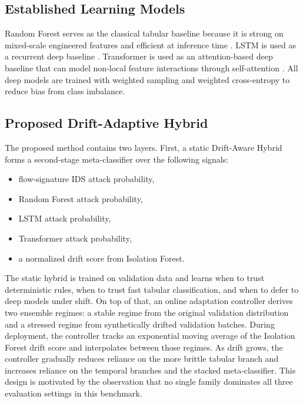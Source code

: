\documentclass[conference]{IEEEtran}
\begin{document}
\subsection{Established Learning Models}
Random Forest serves as the classical tabular baseline because it is strong on mixed-scale engineered features and efficient at inference time \cite{breiman2001random}. LSTM is used as a recurrent deep baseline \cite{hochreiter1997lstm}. Transformer is used as an attention-based deep baseline that can model non-local feature interactions through self-attention \cite{vaswani2017attention}. All deep models are trained with weighted sampling and weighted cross-entropy to reduce bias from class imbalance.

\subsection{Proposed Drift-Adaptive Hybrid}
The proposed method contains two layers. First, a static Drift-Aware Hybrid forms a second-stage meta-classifier over the following signals:
\begin{itemize}
\item flow-signature IDS attack probability,
\item Random Forest attack probability,
\item LSTM attack probability,
\item Transformer attack probability,
\item a normalized drift score from Isolation Forest.
\end{itemize}

The static hybrid is trained on validation data and learns when to trust deterministic rules, when to trust fast tabular classification, and when to defer to deep models under shift. On top of that, an online adaptation controller derives two ensemble regimes: a stable regime from the original validation distribution and a stressed regime from synthetically drifted validation batches. During deployment, the controller tracks an exponential moving average of the Isolation Forest drift score and interpolates between those regimes. As drift grows, the controller gradually reduces reliance on the more brittle tabular branch and increases reliance on the temporal branches and the stacked meta-classifier. This design is motivated by the observation that no single family dominates all three evaluation settings in this benchmark.
\end{document}
